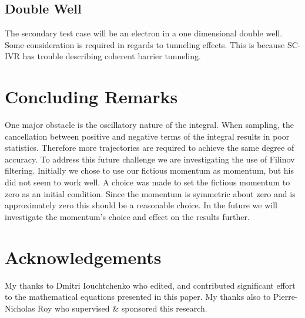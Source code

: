 \documentclass[12pt,letterpaper,oneside,final,titlepage]{article}               %
\numberwithin{equation}{section} %
\begin{document}
\subsection*{Double Well}
The secondary test case will be an electron in a one dimensional double well. 
Some consideration is required in regards to tunneling effects. 
This is because SC-IVR has trouble describing coherent barrier tunneling.

\section{Concluding Remarks}
One major obstacle is the oscillatory nature of the integral. When sampling, the cancellation between positive and negative terms of the integral results in poor statistics. Therefore more trajectories are required to achieve the same degree of accuracy. To address this future challenge we are investigating the use of Filinov filtering.
Initially we chose to use our fictious momentum as momentum, but his did not seem to work well.
A choice was made to set the fictious momentum to zero as an initial condition. 
Since the momentum is symmetric about zero and is approximately zero this should be a reasonable choice.
In the future we will investigate the momentum's choice and effect on the results further.

\section{Acknowledgements}
My thanks to Dmitri Iouchtchenko who edited, and contributed significant effort to the mathematical equations presented in this paper. 
My thanks also to Pierre-Nicholas Roy who supervised \& sponsored this research.

\renewcommand*{\bibfont}{\scriptsize}
\printbibliography
\end{document}
